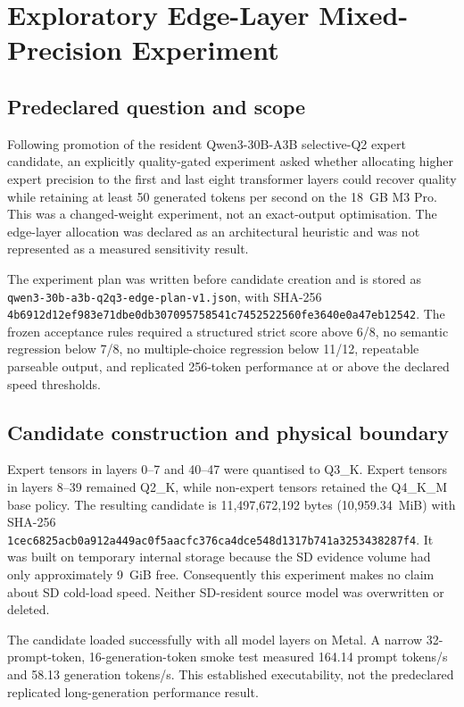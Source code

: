 \section{Exploratory Edge-Layer Mixed-Precision Experiment}
\label{sec:qwen30b-q2q3-edge}

\subsection{Predeclared question and scope}

Following promotion of the resident Qwen3-30B-A3B selective-Q2 expert
candidate, an explicitly quality-gated experiment asked whether allocating
higher expert precision to the first and last eight transformer layers could
recover quality while retaining at least 50 generated tokens per second on the
18~GB M3 Pro.  This was a changed-weight experiment, not an exact-output
optimisation.  The edge-layer allocation was declared as an architectural
heuristic and was not represented as a measured sensitivity result.

The experiment plan was written before candidate creation and is stored as
\texttt{qwen3-30b-a3b-q2q3-edge-plan-v1.json}, with SHA-256
\texttt{4b6912d12ef983e71dbe0db307095758541c7452522560fe3640e0a47eb12542}.
The frozen acceptance rules required a structured strict score above 6/8, no
semantic regression below 7/8, no multiple-choice regression below 11/12,
repeatable parseable output, and replicated 256-token performance at or above
the declared speed thresholds.

\subsection{Candidate construction and physical boundary}

Expert tensors in layers 0--7 and 40--47 were quantised to Q3\_K.  Expert
tensors in layers 8--39 remained Q2\_K, while non-expert tensors retained the
Q4\_K\_M base policy.  The resulting candidate is 11,497,672,192 bytes
(10,959.34~MiB) with SHA-256
\texttt{1cec6825acb0a912a449ac0f5aacfc376ca4dce548d1317b741a3253438287f4}.
It was built on temporary internal storage because the SD evidence volume had
only approximately 9~GiB free.  Consequently this experiment makes no claim
about SD cold-load speed.  Neither SD-resident source model was overwritten or
deleted.

The candidate loaded successfully with all model layers on Metal.  A narrow
32-prompt-token, 16-generation-token smoke test measured 164.14 prompt
tokens/s and 58.13 generation tokens/s.  This established executability, not
the predeclared replicated long-generation performance result.

